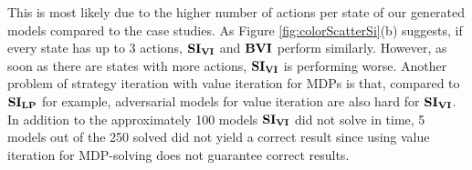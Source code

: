 \FloatBarrier
This is most likely due to the higher number of actions per state of our generated models compared to the case studies.
As Figure \ref{fig:colorScatterSi}(b) suggests, if every state has up to 3 actions, $\mathbf{SI_{VI}}$ and $\mathbf{BVI}$ perform similarly.
However, as soon as there are states with more actions, $\mathbf{SI_{VI}}$ is performing worse.
Another problem of strategy iteration with value iteration for MDPs is that, compared to $\mathbf{SI_{LP}}$ for example, 
adversarial models for value iteration are also hard for $\mathbf{SI_{VI}}$.
In addition to the approximately 100 models $\mathbf{SI_{VI}}$ did not solve in time, 
5 models out of the 250 solved did not yield a correct result since using value iteration for MDP-solving does not guarantee correct results.